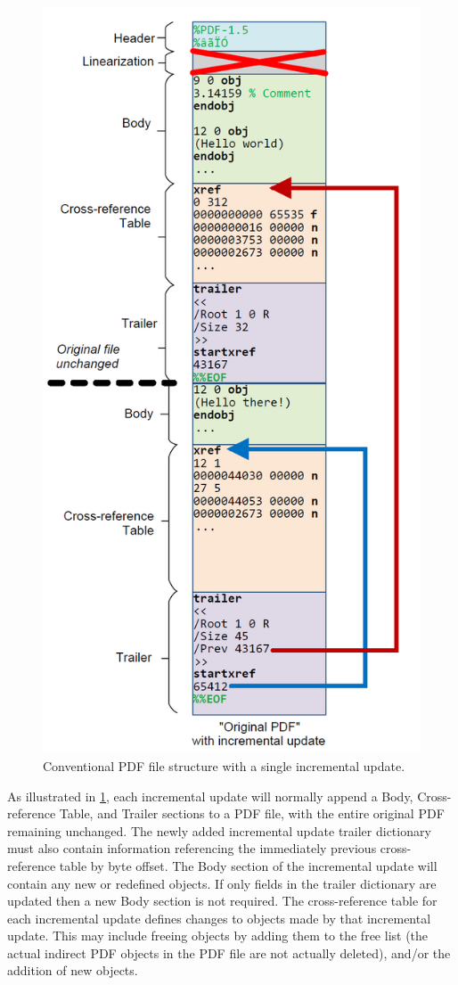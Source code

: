 \begin{figure}[t]
    \centering
    \includegraphics[width=0.65\linewidth]{figures/pdf-structure-incremental.png}
    \caption{Conventional PDF file structure with a single incremental update.}
    \label{fig:pdf-structure-incremental}
\end{figure}

As illustrated in \cref{fig:pdf-structure-incremental}, each incremental update will 
normally append a Body, Cross-reference Table, and Trailer sections
to a PDF file, with the entire original PDF remaining unchanged. The newly added incremental
update trailer dictionary must also contain information referencing the immediately 
previous cross-reference table by byte offset. The Body section of the incremental update 
will contain any new or redefined objects. If only fields in the trailer dictionary are updated then
a new Body section is not required. The cross-reference table for each incremental update
defines changes to objects made by that incremental update. This may include freeing
objects by adding them to the free list (the actual indirect PDF objects in
the PDF file are not actually deleted), and/or the addition of new objects. 

